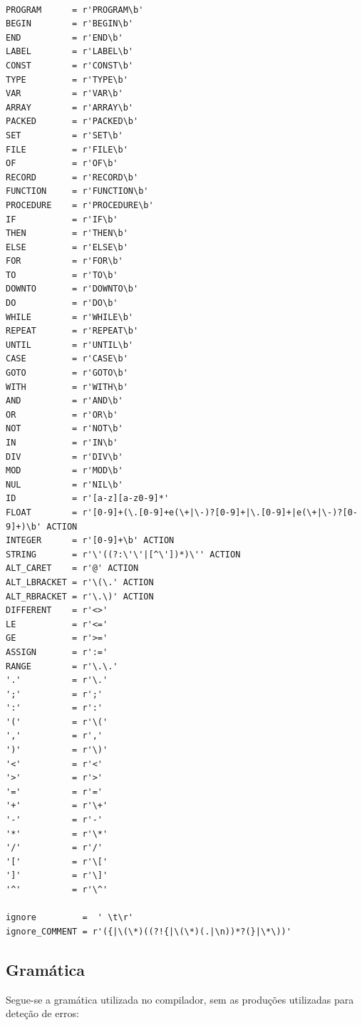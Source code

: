 \documentclass[12pt, a4paper]{article}
\begin{document}
\begin{lstlisting}

PROGRAM      = r'PROGRAM\b'
BEGIN        = r'BEGIN\b'
END          = r'END\b'
LABEL        = r'LABEL\b'
CONST        = r'CONST\b'
TYPE         = r'TYPE\b'
VAR          = r'VAR\b'
ARRAY        = r'ARRAY\b'
PACKED       = r'PACKED\b'
SET          = r'SET\b'
FILE         = r'FILE\b'
OF           = r'OF\b'
RECORD       = r'RECORD\b'
FUNCTION     = r'FUNCTION\b'
PROCEDURE    = r'PROCEDURE\b'
IF           = r'IF\b'
THEN         = r'THEN\b'
ELSE         = r'ELSE\b'
FOR          = r'FOR\b'
TO           = r'TO\b'
DOWNTO       = r'DOWNTO\b'
DO           = r'DO\b'
WHILE        = r'WHILE\b'
REPEAT       = r'REPEAT\b'
UNTIL        = r'UNTIL\b'
CASE         = r'CASE\b'
GOTO         = r'GOTO\b'
WITH         = r'WITH\b'
AND          = r'AND\b'
OR           = r'OR\b'
NOT          = r'NOT\b'
IN           = r'IN\b'
DIV          = r'DIV\b'
MOD          = r'MOD\b'
NUL          = r'NIL\b'
ID           = r'[a-z][a-z0-9]*'
FLOAT        = r'[0-9]+(\.[0-9]+e(\+|\-)?[0-9]+|\.[0-9]+|e(\+|\-)?[0-9]+)\b' ACTION
INTEGER      = r'[0-9]+\b' ACTION
STRING       = r'\'((?:\'\'|[^\'])*)\'' ACTION
ALT_CARET    = r'@' ACTION
ALT_LBRACKET = r'\(\.' ACTION
ALT_RBRACKET = r'\.\)' ACTION
DIFFERENT    = r'<>'
LE           = r'<='
GE           = r'>='
ASSIGN       = r':='
RANGE        = r'\.\.'
'.'          = r'\.'
';'          = r';'
':'          = r':'
'('          = r'\('
','          = r','
')'          = r'\)'
'<'          = r'<'
'>'          = r'>'
'='          = r'='
'+'          = r'\+'
'-'          = r'-'
'*'          = r'\*'
'/'          = r'/'
'['          = r'\['
']'          = r'\]'
'^'          = r'\^'

ignore         =  ' \t\r'
ignore_COMMENT = r'({|\(\*)((?!{|\(\*)(.|\n))*?(}|\*\))'
\end{lstlisting}

\subsection{Gramática}
\label{lexer-definition}

Segue-se a gramática utilizada no compilador, sem as produções utilizadas para deteção de erros:

\end{document}

